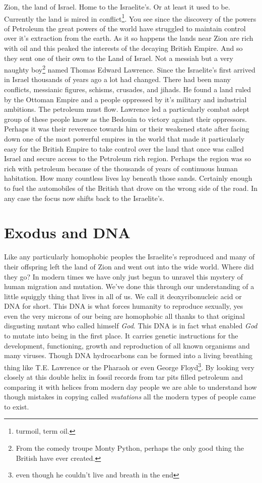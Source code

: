 \documentclass{article}
\begin{document}
Zion, the land of Israel. Home to the Israelite's. Or at least it used to be. Currently the land is mired in conflict\footnote{turmoil, term oil.}. You see since the discovery of the powers of Petroleum the great powers of the world have struggled to maintain control over it's extraction from the earth. As it so happens the lands near Zion are rich with oil and this peaked the interests of the decaying British Empire. And so they sent one of their own to the Land of Israel. Not a messiah but a very naughty boy\footnote{From the comedy troupe Monty Python, perhaps the only good thing the British have ever created.} named Thomas Edward Lawrence. Since the Israelite's first arrived in Israel thousands of years ago a lot had changed. There had been many conflicts, messianic figures, schisms, crusades, and jihads. He found a land ruled by the Ottoman Empire and a people oppressed by it's military and industrial ambitions. The petroleum must flow. Lawrence led a particularly combat adept group of these people know as the Bedouin to victory against their oppressors. Perhaps it was their reverence towards him or their weakened state after facing down one of the most powerful empires in the world that made it particularly easy for the British Empire to take control over the land that once was called Israel and secure access to the Petroleum rich region. Perhaps the region was so rich with petroleum because of the thousands of years of continuous human habitation. How many countless lives lay beneath those sands. Certainly enough to fuel the automobiles of the British that drove on the wrong side of the road. In any case the focus now shifts back to the Israelite's.

\section{Exodus and DNA}

Like any particularly homophobic peoples the Israelite's reproduced and many of their offspring left the land of Zion and went out into the wide world. Where did they go? In modern times we have only just begun to unravel this mystery of human migration and mutation. We've done this through our understanding of a little squiggly thing that lives in all of us. We call it deoxyribonucleic acid or DNA for short. This DNA is what forces humanity to reproduce sexually, yes even the very microns of our being are homophobic all thanks to that original disgusting mutant who called himself \textit{God}. This DNA is in fact what enabled \textit{God} to mutate into being in the first place. It carries genetic instructions for the development, functioning, growth and reproduction of all known organisms and many viruses. Though DNA hydrocarbons can be formed into a living breathing thing like T.E. Lawrence or the Pharaoh or even George Floyd\footnote{even though he couldn't live and breath in the end}. By looking very closely at this double helix in fossil records from tar pits filled petroleum and comparing it with helices from modern day people we are able to understand how though mistakes in copying called \textit{mutations} all the modern types of people came to exist.
\end{document}
